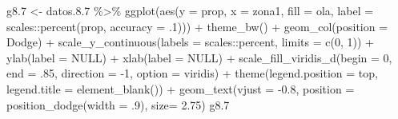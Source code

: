 \documentclass[
  12pt,
]{book}
\newenvironment{Shaded}{\begin{snugshade}}{\end{snugshade}}
\newcommand{\AttributeTok}[1]{\textcolor[rgb]{0.77,0.63,0.00}{#1}}
\newcommand{\ConstantTok}[1]{\textcolor[rgb]{0.00,0.00,0.00}{#1}}
\newcommand{\DecValTok}[1]{\textcolor[rgb]{0.00,0.00,0.81}{#1}}
\newcommand{\FloatTok}[1]{\textcolor[rgb]{0.00,0.00,0.81}{#1}}
\newcommand{\FunctionTok}[1]{\textcolor[rgb]{0.00,0.00,0.00}{#1}}
\newcommand{\NormalTok}[1]{#1}
\newcommand{\OtherTok}[1]{\textcolor[rgb]{0.56,0.35,0.01}{#1}}
\newcommand{\SpecialCharTok}[1]{\textcolor[rgb]{0.00,0.00,0.00}{#1}}
\newcommand{\StringTok}[1]{\textcolor[rgb]{0.31,0.60,0.02}{#1}}
\begin{document}
\begin{Shaded}
\begin{Highlighting}[]
\NormalTok{g8}\FloatTok{.7} \OtherTok{\textless{}{-}}\NormalTok{ datos.}\FloatTok{8.7} \SpecialCharTok{\%\textgreater{}\%} 
  \FunctionTok{ggplot}\NormalTok{(}\FunctionTok{aes}\NormalTok{(}\AttributeTok{y =}\NormalTok{ prop, }\AttributeTok{x =}\NormalTok{ zona1, }\AttributeTok{fill =}\NormalTok{ ola, }
             \AttributeTok{label =}\NormalTok{ scales}\SpecialCharTok{::}\FunctionTok{percent}\NormalTok{(prop, }\AttributeTok{accuracy =}\NormalTok{ .}\DecValTok{1}\NormalTok{))) }\SpecialCharTok{+} 
  \FunctionTok{theme\_bw}\NormalTok{() }\SpecialCharTok{+} 
  \FunctionTok{geom\_col}\NormalTok{(}\AttributeTok{position =} \StringTok{\textquotesingle{}Dodge\textquotesingle{}}\NormalTok{) }\SpecialCharTok{+}
  \FunctionTok{scale\_y\_continuous}\NormalTok{(}\AttributeTok{labels =}\NormalTok{ scales}\SpecialCharTok{::}\NormalTok{percent,}
                     \AttributeTok{limits =} \FunctionTok{c}\NormalTok{(}\DecValTok{0}\NormalTok{, }\DecValTok{1}\NormalTok{)) }\SpecialCharTok{+}
  \FunctionTok{ylab}\NormalTok{(}\AttributeTok{label =} \ConstantTok{NULL}\NormalTok{) }\SpecialCharTok{+}
  \FunctionTok{xlab}\NormalTok{(}\AttributeTok{label =} \ConstantTok{NULL}\NormalTok{) }\SpecialCharTok{+}
  \FunctionTok{scale\_fill\_viridis\_d}\NormalTok{(}\AttributeTok{begin =} \DecValTok{0}\NormalTok{, }\AttributeTok{end =}\NormalTok{ .}\DecValTok{85}\NormalTok{, }\AttributeTok{direction =} \SpecialCharTok{{-}}\DecValTok{1}\NormalTok{, }\AttributeTok{option =} \StringTok{\textquotesingle{}viridis\textquotesingle{}}\NormalTok{) }\SpecialCharTok{+}
  \FunctionTok{theme}\NormalTok{(}\AttributeTok{legend.position =} \StringTok{\textquotesingle{}top\textquotesingle{}}\NormalTok{,}
        \AttributeTok{legend.title =} \FunctionTok{element\_blank}\NormalTok{()) }\SpecialCharTok{+}
  \FunctionTok{geom\_text}\NormalTok{(}\AttributeTok{vjust =} \SpecialCharTok{{-}}\FloatTok{0.8}\NormalTok{,}
            \AttributeTok{position =} \FunctionTok{position\_dodge}\NormalTok{(}\AttributeTok{width =}\NormalTok{ .}\DecValTok{9}\NormalTok{),}
            \AttributeTok{size=} \FloatTok{2.75}\NormalTok{)}
\NormalTok{g8}\FloatTok{.7}
\end{Highlighting}
\end{Shaded}
\end{document}
